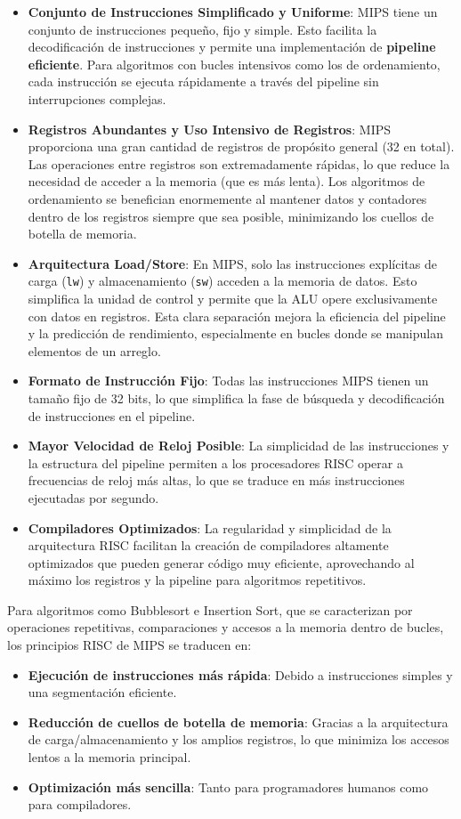 \documentclass{article}
\begin{document}
\begin{itemize}
    \item \textbf{Conjunto de Instrucciones Simplificado y Uniforme}: MIPS tiene un conjunto de instrucciones pequeño, fijo y simple. Esto facilita la decodificación de instrucciones y permite una implementación de \textbf{pipeline eficiente}. Para algoritmos con bucles intensivos como los de ordenamiento, cada instrucción se ejecuta rápidamente a través del pipeline sin interrupciones complejas.
    \item \textbf{Registros Abundantes y Uso Intensivo de Registros}: MIPS proporciona una gran cantidad de registros de propósito general (32 en total). Las operaciones entre registros son extremadamente rápidas, lo que reduce la necesidad de acceder a la memoria (que es más lenta). Los algoritmos de ordenamiento se benefician enormemente al mantener datos y contadores dentro de los registros siempre que sea posible, minimizando los cuellos de botella de memoria.
    \item \textbf{Arquitectura Load/Store}: En MIPS, solo las instrucciones explícitas de carga (\texttt{lw}) y almacenamiento (\texttt{sw}) acceden a la memoria de datos. Esto simplifica la unidad de control y permite que la ALU opere exclusivamente con datos en registros. Esta clara separación mejora la eficiencia del pipeline y la predicción de rendimiento, especialmente en bucles donde se manipulan elementos de un arreglo.
    \item \textbf{Formato de Instrucción Fijo}: Todas las instrucciones MIPS tienen un tamaño fijo de 32 bits, lo que simplifica la fase de búsqueda y decodificación de instrucciones en el pipeline.
    \item \textbf{Mayor Velocidad de Reloj Posible}: La simplicidad de las instrucciones y la estructura del pipeline permiten a los procesadores RISC operar a frecuencias de reloj más altas, lo que se traduce en más instrucciones ejecutadas por segundo.
    \item \textbf{Compiladores Optimizados}: La regularidad y simplicidad de la arquitectura RISC facilitan la creación de compiladores altamente optimizados que pueden generar código muy eficiente, aprovechando al máximo los registros y la pipeline para algoritmos repetitivos.
\end{itemize}
Para algoritmos como Bubblesort e Insertion Sort, que se caracterizan por operaciones repetitivas, comparaciones y accesos a la memoria dentro de bucles, los principios RISC de MIPS se traducen en:
\begin{itemize}
    \item \textbf{Ejecución de instrucciones más rápida}: Debido a instrucciones simples y una segmentación eficiente.
    \item \textbf{Reducción de cuellos de botella de memoria}: Gracias a la arquitectura de carga/almacenamiento y los amplios registros, lo que minimiza los accesos lentos a la memoria principal.
    \item \textbf{Optimización más sencilla}: Tanto para programadores humanos como para compiladores.
\end{itemize}
\end{document}

